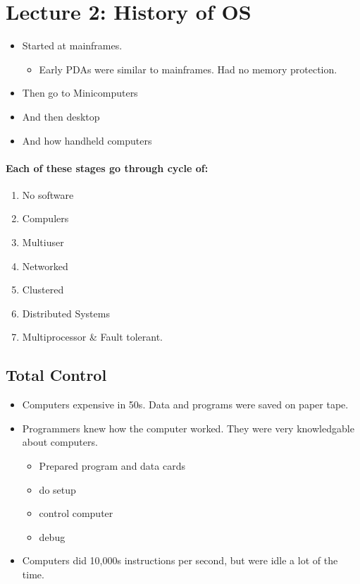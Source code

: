 \documentclass{article}
\newcommand\tab[1][0.5cm]{\hspace*{#1}}
\begin{document}
\section{Lecture 2: History of OS}
	\begin{itemize}
		\item Started at mainframes.
		\begin{itemize}
			\item Early PDAs were similar to mainframes. Had no memory protection.
		\end{itemize}
		\item Then go to Minicomputers
		\item And then desktop
		\item And how handheld computers
	\end{itemize}

	\paragraph{\tab Each of these stages go through cycle of:}
	\begin{enumerate}
		\item No software
		\item Compulers
		\item Multiuser
		\item Networked
		\item Clustered
		\item Distributed Systems
		\item Multiprocessor \& Fault tolerant.
	\end{enumerate}

	\subsection{Total Control}
		\begin{itemize}
			\item Computers expensive in 50s. Data and programs were saved on paper tape.
			\item Programmers knew how the computer worked. They were very knowledgable about computers.
			\begin{itemize}
				\item Prepared program and data cards
				\item do setup
				\item control computer
				\item debug
			\end{itemize}
			\item Computers did 10,000s instructions per second, but were idle a lot of the time.
		\end{itemize}
\end{document}
